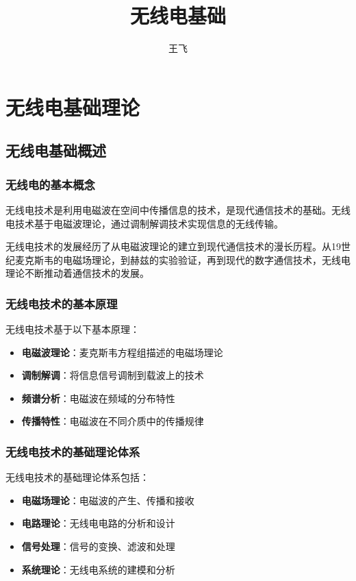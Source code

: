 \documentclass[12pt,UTF8]{ctexbook}
\title{\heiti\zihao{0} 无线电基础}
\author{王飞}
\date{}
\begin{document}
\maketitle
\tableofcontents

\frontmatter

\mainmatter

\part{无线电基础理论}

\chapter{无线电基础概述}

\section{无线电的基本概念}

无线电技术是利用电磁波在空间中传播信息的技术，是现代通信技术的基础。无线电技术基于电磁波理论，通过调制解调技术实现信息的无线传输。

无线电技术的发展经历了从电磁波理论的建立到现代通信技术的漫长历程。从19世纪麦克斯韦的电磁场理论，到赫兹的实验验证，再到现代的数字通信技术，无线电理论不断推动着通信技术的发展。

\section{无线电技术的基本原理}

无线电技术基于以下基本原理：

\begin{itemize}[leftmargin=3.5em]
    \item \textbf{电磁波理论}：麦克斯韦方程组描述的电磁场理论
    \item \textbf{调制解调}：将信息信号调制到载波上的技术
    \item \textbf{频谱分析}：电磁波在频域的分布特性
    \item \textbf{传播特性}：电磁波在不同介质中的传播规律
\end{itemize}

\section{无线电技术的基础理论体系}

无线电技术的基础理论体系包括：

\begin{itemize}[leftmargin=3.5em]
    \item \textbf{电磁场理论}：电磁波的产生、传播和接收
    \item \textbf{电路理论}：无线电电路的分析和设计
    \item \textbf{信号处理}：信号的变换、滤波和处理
    \item \textbf{系统理论}：无线电系统的建模和分析
\end{itemize}
\end{document}
